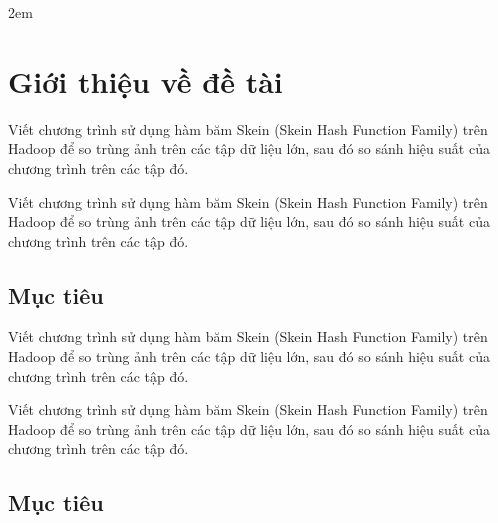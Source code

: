 \documentclass[11pt, a4paper]{article}
\begin{document}
\newpage
\tableofcontents
\newpage

\parindent2em
	
\section{Giới thiệu về đề tài} %
\label{sec:introduction}
	Viết chương trình sử dụng hàm băm Skein (Skein Hash Function Family) trên Hadoop để so trùng ảnh trên các tập dữ liệu lớn, sau đó so sánh hiệu suất của chương trình trên các tập đó. \cite{web:hadoop_introduction}
	
	Viết chương trình sử dụng hàm băm Skein (Skein Hash Function Family) trên Hadoop để so trùng ảnh trên các tập dữ liệu lớn, sau đó so sánh hiệu suất của chương trình trên các tập đó. \cite{web:hadoop_introduction}

\subsection{Mục tiêu}
	Viết chương trình sử dụng hàm băm Skein (Skein Hash Function Family) trên Hadoop để so trùng ảnh trên các tập dữ liệu lớn, sau đó so sánh hiệu suất của chương trình trên các tập đó. \cite{web:hadoop_introduction}
	
	Viết chương trình sử dụng hàm băm Skein (Skein Hash Function Family) trên Hadoop để so trùng ảnh trên các tập dữ liệu lớn, sau đó so sánh hiệu suất của chương trình trên các tập đó. \cite{web:hadoop_introduction}
\subsection{Mục tiêu}

\clearpage


\end{document}
